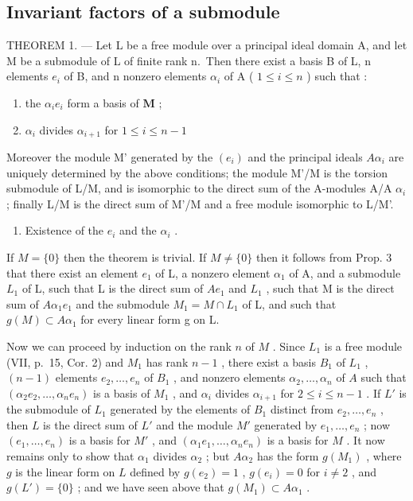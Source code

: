\subsection{Invariant factors of a submodule}

THEOREM 1. --- Let L be a free module over a principal ideal domain A, and let M be a submodule of L of finite rank n.~Then there exist a basis B of L, n elements \(e_{i}\) of B, and n nonzero elements \(\alpha_{i}\) of A ( \(1 \leqslant i \leqslant n\) ) such that :

\begin{enumerate}
\def\labelenumi{\alph{enumi})}
\item
  the \(\alpha_{i}e_{i}\) form a basis of \(\mathbf{M}\) ;
\item
  \(\alpha_{i}\) divides \(\alpha_{i + 1}\) for \(1\leqslant i\leqslant n - 1\)
\end{enumerate}

Moreover the module M' generated by the \((e_{i})\) and the principal ideals \(A\alpha_{i}\) are uniquely determined by the above conditions; the module M'/M is the torsion submodule of L/M, and is isomorphic to the direct sum of the A-modules A/A \(\alpha_{i}\) ; finally L/M is the direct sum of M'/M and a free module isomorphic to L/M'.

\begin{enumerate}
\def\labelenumi{\arabic{enumi})}
\tightlist
\item
  Existence of the \(e_i\) and the \(\alpha_i\) .
\end{enumerate}

If \(M = \{0\}\) then the theorem is trivial. If \(M \neq \{0\}\) then it follows from Prop. 3 that there exist an element \(e_{1}\) of L, a nonzero element \(\alpha_{1}\) of A, and a submodule \(L_{1}\) of L, such that L is the direct sum of \(Ae_{1}\) and \(L_{1}\) , such that M is the direct sum of \(A\alpha_{1}e_{1}\) and the submodule \(M_{1} = M \cap L_{1}\) of L, and such that \(g(M) \subset A\alpha_{1}\) for every linear form g on L.

Now we can proceed by induction on the rank \(n\) of \(M\) . Since \(L_1\) is a free module (VII, p.~15, Cor. 2) and \(M_1\) has rank \(n - 1\) , there exist a basis \(B_1\) of \(L_1\) , \((n - 1)\) elements \(e_2, \ldots, e_n\) of \(B_1\) , and nonzero elements \(\alpha_2, \ldots, \alpha_n\) of \(A\) such that \((\alpha_2e_2, \ldots, \alpha_ne_n)\) is a basis of \(M_1\) , and \(\alpha_i\) divides \(\alpha_{i+1}\) for \(2 \leqslant i \leqslant n - 1\) . If \(L'\) is the submodule of \(L_1\) generated by the elements of \(B_1\) distinct from \(e_2, \ldots, e_n\) , then \(L\) is the direct sum of \(L'\) and the module \(M'\) generated by \(e_1, \ldots, e_n\) ; now \((e_1, \ldots, e_n)\) is a basis for \(M'\) , and \((\alpha_1e_1, \ldots, \alpha_ne_n)\) is a basis for \(M\) . It now remains only to show that \(\alpha_1\) divides \(\alpha_2\) ; but \(A\alpha_2\) has the form \(g(M_1)\) , where \(g\) is the linear form on \(L\) defined by \(g(e_2) = 1\) , \(g(e_i) = 0\) for \(i \neq 2\) , and \(g(L') = \{0\}\) ; and we have seen above that \(g(M_1) \subset A\alpha_1\) .

